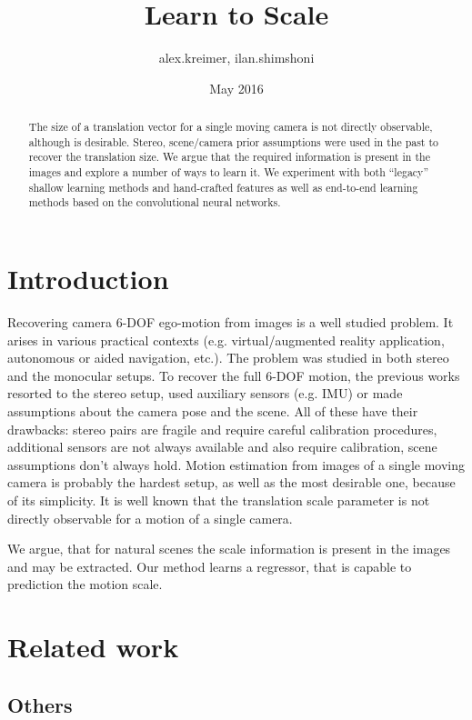 \documentclass{article}
\title{Learn to Scale}
\author{alex.kreimer, ilan.shimshoni}
\date{May 2016}
\begin{document}
\maketitle

\begin{abstract}
  The size of a translation vector for a single moving camera is not
  directly observable, although is desirable.  Stereo, scene/camera
  prior assumptions were used in the past to recover the translation
  size.  We argue that the required information is present in the
  images and explore a number of ways to learn it.  We experiment with
  both ``legacy'' shallow learning methods and hand-crafted features
  as well as end-to-end learning methods based on the convolutional
  neural networks.
\end{abstract}

\section{Introduction}

Recovering camera 6-DOF ego-motion from images is a well studied
problem. It arises in various practical contexts
(e.g. virtual/augmented reality application, autonomous or aided
navigation, etc.).  The problem was studied in both stereo and the
monocular setups.  To recover the full 6-DOF motion, the previous
works resorted to the stereo setup, used auxiliary sensors (e.g. IMU)
or made assumptions about the camera pose and the scene.  All of these
have their drawbacks: stereo pairs are fragile and require careful
calibration procedures, additional sensors are not always available
and also require calibration, scene assumptions don't always hold.
Motion estimation from images of a single moving camera is probably
the hardest setup, as well as the most desirable one, because of its
simplicity.  It is well known that the translation scale parameter is
not directly observable for a motion of a single camera.

We argue, that for natural scenes the scale information is present in
the images and may be extracted.  Our method learns a regressor, that
is capable to prediction the motion scale.

\section{Related work}

\subsection{Others}
\end{document}
